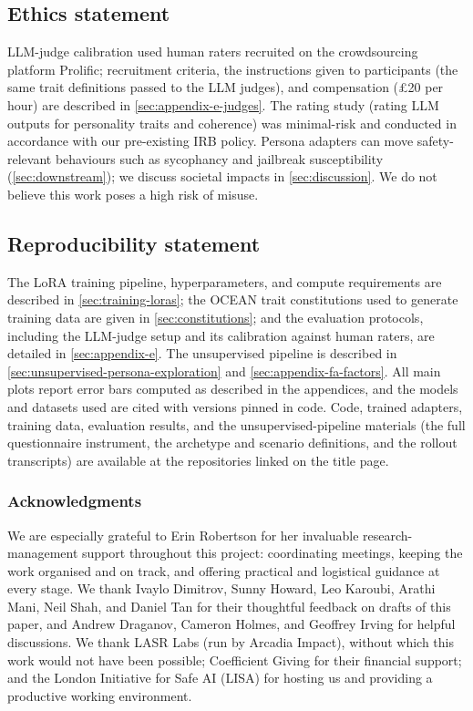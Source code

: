 \documentclass{article}
\newif\ifanon
\newenvironment{ack}{\subsubsection*{Acknowledgments}}{}
\begin{document}
\subsection*{Ethics statement}
LLM-judge calibration used human raters recruited on the crowdsourcing platform Prolific; recruitment criteria, the instructions given to participants (the same trait definitions passed to the LLM judges), and compensation (\pounds20 per hour) are described in \cref{sec:appendix-e-judges}. The rating study (rating LLM outputs for personality traits and coherence) was minimal-risk and conducted in accordance with our pre-existing IRB policy. Persona adapters can move safety-relevant behaviours such as sycophancy and jailbreak susceptibility (\cref{sec:downstream}); we discuss societal impacts in \cref{sec:discussion}. We do not believe this work poses a high risk of misuse.

\subsection*{Reproducibility statement}
The LoRA training pipeline, hyperparameters, and compute requirements are described in \cref{sec:training-loras}; the OCEAN trait constitutions used to generate training data are given in \cref{sec:constitutions}; and the evaluation protocols, including the LLM-judge setup and its calibration against human raters, are detailed in \cref{sec:appendix-e}. The unsupervised pipeline is described in \cref{sec:unsupervised-persona-exploration} and \cref{sec:appendix-fa-factors}. All main plots report error bars computed as described in the appendices, and the models and datasets used are cited with versions pinned in code. Code, trained adapters, training data, evaluation results, and the unsupervised-pipeline materials (the full questionnaire instrument, the archetype and scenario definitions, and the rollout transcripts) \ifanon will be released publicly upon acceptance; they are withheld here to preserve anonymity\else are available at the repositories linked on the title page\fi.

\ifanon\else
\begin{ack}
We are especially grateful to Erin Robertson for her invaluable research-management support throughout this project: coordinating meetings, keeping the work organised and on track, and offering practical and logistical guidance at every stage. We thank Ivaylo Dimitrov, Sunny Howard, Leo Karoubi, Arathi Mani, Neil Shah, and Daniel Tan for their thoughtful feedback on drafts of this paper, and Andrew Draganov, Cameron Holmes, and Geoffrey Irving for helpful discussions. We thank LASR Labs (run by Arcadia Impact), without which this work would not have been possible; Coefficient Giving for their financial support; and the London Initiative for Safe AI (LISA) for hosting us and providing a productive working environment.
\end{ack}
\fi
\end{document}
